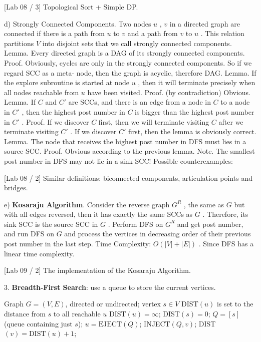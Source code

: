 \documentclass[10pt,a4paper]{article}
\begin{document}
[Lab 08 / 3] Topological Sort + Simple DP.

d) Strongly Connected Components. Two nodes \(u\) , \(v\) in a directed graph are connected if there is a path from \(u\) to \(v\) and a path from \(v\) to \(u\) . This relation partitions \(V\) into disjoint sets that we call strongly connected components.
Lemma. Every directed graph is a DAG of its strongly connected components.
Proof. Obviously, cycles are only in the strongly connected components. So if we regard SCC as a meta- node, then the graph is acyclic, therefore DAG.
Lemma. If the explore subroutine is started at node \(u\) , then it will terminate precisely when all nodes reachable from \(u\) have been visited.
Proof. (by contradiction) Obvious.
Lemma. If \(C\) and \(C'\) are SCCs, and there is an edge from a node in \(C\) to a node in \(C'\) , then the highest post number in \(C\) is bigger than the highest post number in \(C'\) .
Proof. If we discover \(C\) first, then we will terminate visiting \(C\) after we terminate visiting \(C'\) . If we discover \(C'\) first, then the lemma is obviously correct.
Lemma. The node that receives the highest post number in DFS must lies in a source SCC.
Proof. Obvious according to the previous lemma.
Note. The smallest post number in DFS may not lie in a sink SCC! Possible counterexamples:
\begin{center}
\end{center}

[Lab 08 / 2] Similar definitions: biconnected components, articulation points and bridges.

e) \textbf{Kosaraju Algorithm}. Consider the reverse graph \(G^{R}\) , the same as \(G\) but with all edges reversed, then it has exactly the same SCCs as \(G\) . Therefore, its sink SCC is the source SCC in \(G\) . Perform DFS on \(G^{R}\) and get post number, and run DFS on \(G\) and process the vertices in decreasing order of their previous post number in the last step.
Time Complexity: \(O(|V| + |E|)\) . Since DFS has a linear time complexity.

[Lab 09 / 2] The implementation of the Kosaraju Algorithm.

3. \textbf{Breadth-First Search}: use a queue to store the current vertices.
\begin{algorithm}
\caption{BFS\((G, s)\)}
\begin{algorithmic}[1]
\Input Graph \(G = (V, E)\), directed or undirected; vertex \(s \in V\)
\Output DIST\((u)\) is set to the distance from \(s\) to all reachable \(u\)
    \State DIST\((u) = \infty\);
\EndFor
\State DIST\((s) = 0\);
\State \(Q = [s]\) (queue containing just \(s\));
    \State \(u = \text{EJECT}(Q)\);
            \State INJECT\((Q, v)\);
            \State DIST\((v) = \text{DIST}(u) + 1\);
        \EndIf
    \EndFor
\EndWhile
\end{algorithmic}
\end{algorithm}
\end{document}
